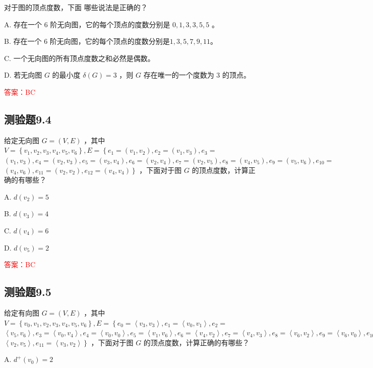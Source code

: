 \documentclass[UTF8, heading=true]{ctexart}
\begin{document}
对于图的顶点度数，下面 哪些说法是正确的？

A. 存在一个 6 阶无向图，它的每个顶点的度数分别是 $0,1,3,3,5,5$ 。

B. 存在一个 6 阶无向图，它的每个顶点的度数分别是$1,3,5,7,9,11$。

C. 一个无向图的所有顶点度数之和必然是偶数。

D. 若无向图 $G$ 的最小度 $\delta(G)=3$ ，则 $G$ 存在唯一的一个度数为 3 的顶点。

\textcolor{red}{答案：BC}


\subsection{测验题9.4}

给定无向图 $G=(V, E)$ ，其中 $V=\left\{v_1, v_2, v_3, v_4, v_5, v_6\right\}, E=\left\{e_1=\left(v_1, v_2\right), e_2=\left(v_1, v_3\right), e_3=\right.$ $\left(v_1, v_3\right), e_4=\left(v_2, v_3\right), e_5=\left(v_3, v_4\right), e_6=\left(v_2, v_4\right), e_7=\left(v_2, v_5\right), e_8=\left(v_4, v_5\right), e_9=\left(v_5, v_6\right), e_{10}=$ $\left.\left(v_4, v_6\right), e_{11}=\left(v_2, v_2\right), e_{12}=\left(v_4, v_4\right)\right\}$ ，下面对于图 $G$ 的顶点度数，计算正确的有哪些？

A. $d\left(v_2\right)=5$

B. $d\left(v_3\right)=4$

C. $d\left(v_4\right)=6$

D. $ d\left(v_5\right)=2$

\textcolor{red}{答案：BC}

\subsection{测验题9.5}

给定有向图 $G=(V, E)$ ，其中 $V=\left\{v_0, v_1, v_2, v_3, v_4, v_5, v_6\right\}, E=\left\{e_0=\left\langle v_3, v_3\right\rangle, e_1=\left\langle v_0, v_1\right\rangle, e_2=\right.$ $\left\langle v_5, v_6\right\rangle, e_3=\left\langle v_0, v_4\right\rangle, e_4=\left\langle v_0, v_0\right\rangle, e_5=\left\langle v_1, v_6\right\rangle, e_6=\left\langle v_4, v_2\right\rangle, e_7=\left\langle v_4, v_3\right\rangle, e_8=\left\langle v_6, v_2\right\rangle, e_9=\left\langle v_6, v_0\right\rangle, e_{10}=$ $\left.\left\langle v_2, v_5\right\rangle, e_{11}=\left\langle v_3, v_2\right\rangle\right\}$ ，下面对于图 $G$ 的顶点度数，计算正确的有哪些？

A. $d^{+}\left(v_0\right)=2$
\end{document}
